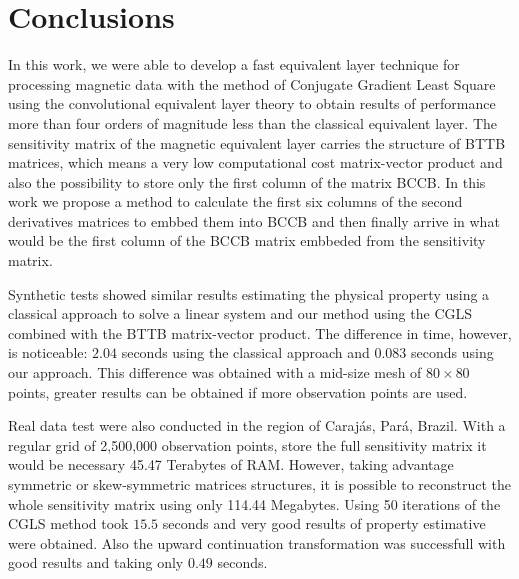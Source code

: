\section{Conclusions}

In this work, we were able to develop a fast equivalent layer technique for processing magnetic data with the method of Conjugate Gradient Least Square using the convolutional equivalent layer theory to obtain results of performance more than four orders of magnitude less than the classical equivalent layer. The sensitivity matrix of the magnetic equivalent layer carries the structure of BTTB matrices, which means a very low computational cost matrix-vector product and also the possibility to store only the first column of the matrix BCCB. In this work we propose a method to calculate the first six columns of the second derivatives matrices to embbed them into BCCB and then finally arrive in what would be the first column of the BCCB matrix embbeded from the sensitivity matrix.

Synthetic tests showed similar results estimating the physical property using a classical approach to solve a linear system and our method using the CGLS combined with the BTTB matrix-vector product. The difference in time, however, is noticeable: $2.04$ seconds using the classical approach and $0.083$ seconds using our approach. This difference was obtained with a mid-size mesh of $80 \times 80$ points, greater results can be obtained if more observation points are used.

Real data test were also conducted in the region of Carajás, Pará, Brazil. With a regular grid of 2,500,000 observation points, store the full sensitivity matrix it would be necessary 45.47 Terabytes of RAM.  However, taking advantage symmetric or skew-symmetric matrices structures, it is possible to reconstruct the whole sensitivity matrix using only 114.44 Megabytes.
Using 50 iterations of the CGLS method took $15.5$ seconds and very good results of property estimative were obtained. Also the upward continuation transformation was successfull with good results and taking only $0.49$ seconds.
